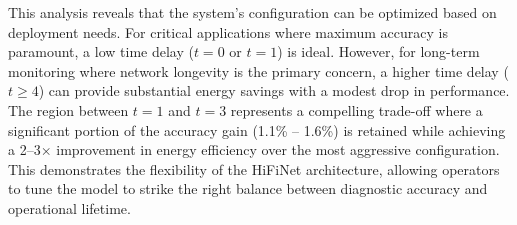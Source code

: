 This analysis reveals that the system's configuration can be optimized based on deployment needs. For critical applications where maximum accuracy is paramount, a low time delay ($t=0$ or $t=1$) is ideal. However, for long-term monitoring where network longevity is the primary concern, a higher time delay (\(t\ge4\)) can provide substantial energy savings with a modest drop in performance. The region between \(t=1\) and \(t=3\) represents a compelling trade-off where a significant portion of the accuracy gain (1.1\% -- 1.6\%) is retained while achieving a 2--3\(\times\) improvement in energy efficiency over the most aggressive configuration. This demonstrates the flexibility of the HiFiNet architecture, allowing operators to tune the model to strike the right balance between diagnostic accuracy and operational lifetime.
